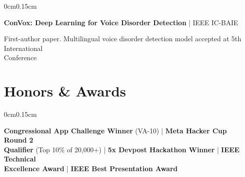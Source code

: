\documentclass[10pt, letterpaper]{article}
\newenvironment{onecolentry}{
    \begin{adjustwidth}{0cm}{0.15cm}
}{
    \end{adjustwidth}
}
\begin{document}
    \vspace{0.1cm}

    \begin{onecolentry}
        \textbf{ConVox: Deep Learning for Voice Disorder Detection} | IEEE IC-BAIE
        
        \vspace{0.05cm}
        First-author paper. Multilingual voice disorder detection model accepted at 5th International\\Conference
    \end{onecolentry}

    \section{Honors \& Awards}
    \vspace{0.05cm}

    \begin{onecolentry}
        \textbf{Congressional App Challenge Winner} (VA-10) | \textbf{Meta Hacker Cup Round 2\\Qualifier} (Top 10\% of 20,000+) | \textbf{5x Devpost Hackathon Winner} | \textbf{IEEE Technical\\Excellence Award} | \textbf{IEEE Best Presentation Award}
    \end{onecolentry}
\end{document}
